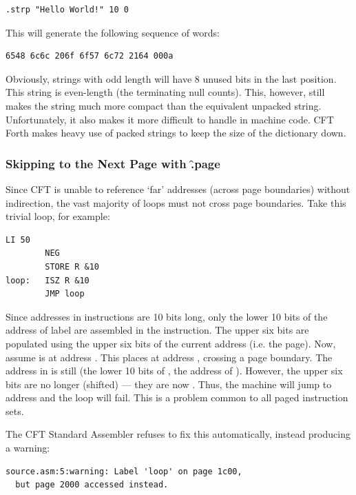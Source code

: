 \begin{lstlisting}[language=cftasm,numbers=none]
.strp "Hello World!" 10 0
\end{lstlisting}

This will generate the following sequence of words:

\begin{lstlisting}[numbers=none]
6548 6c6c 206f 6f57 6c72 2164 000a
\end{lstlisting}

Obviously, strings with odd length will have 8 unused bits in the last
position. This string is even-length (the terminating null counts). This,
however, still makes the string much more compact than the equivalent unpacked
string. Unfortunately, it also makes it more difficult to handle in machine
code. CFT Forth makes heavy use of packed strings to keep the size of the
dictionary down.



\subsubsection{Skipping to the Next Page with \f{.page}}

Since CFT is unable to reference ‘far’ addresses (across page boundaries)
without indirection, the vast majority of loops must not cross page
boundaries. Take this trivial loop, for example:

\begin{lstlisting}[language=cftasm]
        LI 50
        NEG
        STORE R &10
loop:   ISZ R &10
        JMP loop
\end{lstlisting}

Since addresses in instructions are 10 bits long, only the lower 10 bits of the
address of label  are assembled in the  instruction. The upper
six bits are populated using the upper six bits of the current address
(i.e. the page). Now, assume  is at address . This places
 at address , crossing a page boundary. The address in
 is still  (the lower 10 bits of , the address of
). However, the upper six bits are no longer  (shifted) —
they are now . Thus, the machine will jump to address  and
the loop will fail. This is a problem common to all paged instruction sets.

The CFT Standard Assembler refuses to fix this automatically, instead producing a warning:

\begin{lstlisting}[numbers=none]
source.asm:5:warning: Label 'loop' on page 1c00,
  but page 2000 accessed instead.
\end{lstlisting}

